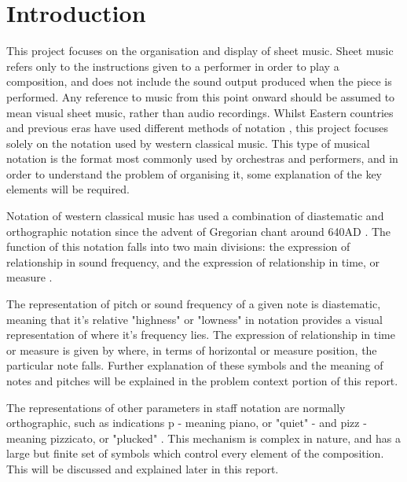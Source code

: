\section{Introduction}
This project focuses on the organisation and display of sheet music. Sheet music refers only to the instructions given to a performer in order to play a composition, and does not include the sound output produced when the piece is performed. Any reference to music from this point onward should be assumed to mean visual sheet music, rather than audio recordings.
Whilst Eastern countries and previous eras have used different methods of notation \parencite{Kaufman}, this project focuses solely on the notation used by western classical music. This type of musical notation is the format most commonly used by orchestras and performers, and in order to understand the problem of organising it, some explanation of the key elements will be required.

Notation of western classical music has used a combination of diastematic and orthographic notation \parencite{RRastall} since the advent of Gregorian chant around 640AD \parencite{RTaruskin}. The function of this notation falls into two main divisions: the expression of relationship in sound frequency, and the expression of relationship in time, or measure \parencite{oxHistory}.

The representation of pitch or sound frequency of a given note is diastematic, meaning that it's relative "highness" or "lowness" in notation provides a visual representation of where it's frequency lies. The expression of relationship in time or measure is given by where, in terms of horizontal or measure position, the particular note falls. Further explanation of these symbols and the meaning of notes and pitches will be explained in the problem context portion of this report.

The representations of other parameters in staff notation are normally orthographic, such as indications p - meaning piano, or "quiet" - and pizz - meaning pizzicato, or "plucked" \parencite{RRastall}. This mechanism is complex in nature, and has a large but finite set of symbols which control every element of the composition. This will be discussed and explained later in this report.

